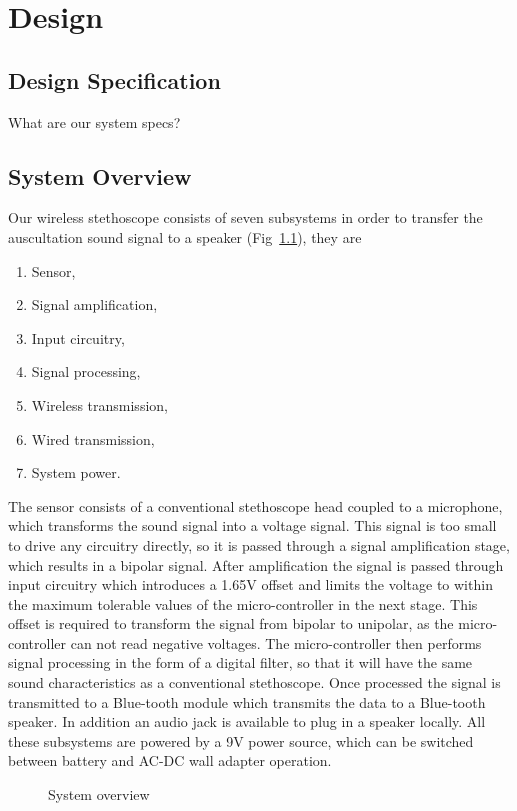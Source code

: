 \chapter{Design} \label{design}

\section{Design Specification}
What are our system specs?

\section{System Overview}
Our wireless stethoscope consists of seven subsystems in order to transfer the auscultation sound signal to a speaker (Fig~\ref{fig:sys_overview}), they are
\begin{enumerate}
	\item Sensor,
	\item Signal amplification,
	\item Input circuitry,
	\item Signal processing,
	\item Wireless transmission,
	\item Wired transmission,
	\item System power.
\end{enumerate}
The sensor consists of a conventional stethoscope head coupled to a microphone, which transforms the sound signal into a voltage signal. This signal is too small to drive any circuitry directly, so it is passed through a signal amplification stage, which results in a bipolar signal. After amplification the signal is passed through input circuitry which introduces a 1.65V offset and limits the voltage to within the maximum tolerable values of the micro-controller in the next stage. This offset is required to transform the signal from bipolar to unipolar, as the micro-controller can not read negative voltages. The micro-controller then performs signal processing in the form of a digital filter, so that it will have the same sound characteristics as a conventional stethoscope. Once processed the signal is transmitted to a Blue-tooth module which transmits the data to a Blue-tooth speaker. In addition an audio jack is available to plug in a speaker locally. All these subsystems are powered by a 9V power source, which can be switched between battery and AC-DC wall adapter operation.

\begin{figure}[!ht]
	\centering
	\caption{System overview}
	\label{fig:sys_overview}
\end{figure}

